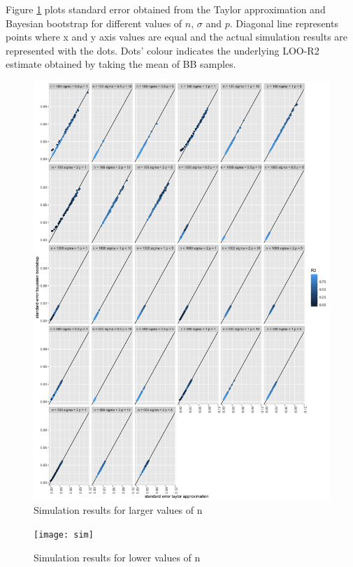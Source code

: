 \documentclass{article}
\begin{document}
Figure \ref{fig:simres} plots standard error obtained from the Taylor approximation and Bayesian bootstrap for different values of $n$, $\sigma$ and $p$. Diagonal line represents points where x and y axis values are equal and the actual simulation results are represented with the dots. Dots' colour indicates the underlying LOO-R2 estimate obtained by taking the mean of BB samples.
\begin{figure}
    \centering
    \includegraphics[width=\textwidth]{simres.png}
    \caption{ Simulation results for larger values of n}
    \label{fig:simres}
\end{figure}

\begin{figure}
    \centering
    \texttt{[image: sim]}
    \caption{ Simulation results for lower values of n}
    \label{fig:simres_low_n}
\end{figure}


\newpage


\end{document}
